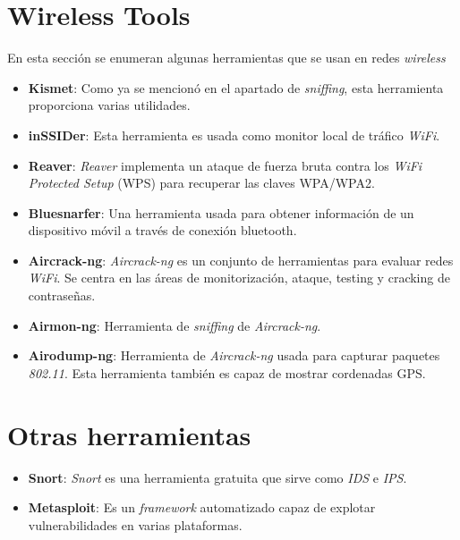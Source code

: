\documentclass[bibliography=totocnumbered]{scrartcl}
\begin{document}
\section{Wireless Tools}
En esta sección se enumeran algunas herramientas que se usan en redes \textit{wireless}
\begin{itemize}
    \item \textbf{Kismet}\parencite{kismet}: Como ya se mencionó en el apartado de \textit{sniffing}, esta herramienta proporciona varias utilidades.
    \item \textbf{inSSIDer}\parencite{inssider}: Esta herramienta es usada como monitor local de tráfico \textit{WiFi}.
    \item \textbf{Reaver}\parencite{reaver}: \textit{Reaver} implementa un ataque de fuerza bruta contra los \textit{WiFi Protected Setup} (WPS) para recuperar las claves WPA/WPA2.
    \item \textbf{Bluesnarfer}\parencite{bluesnarfer}: Una herramienta usada para obtener información de un dispositivo móvil a través de conexión bluetooth.
    \item \textbf{Aircrack-ng}\parencite{aircrack}: \textit{Aircrack-ng} es un conjunto de herramientas para evaluar redes \textit{WiFi}. Se centra en las áreas de monitorización, ataque, testing y cracking de contraseñas.
    \item \textbf{Airmon-ng}\parencite{airmon}: Herramienta de \textit{sniffing} de \textit{Aircrack-ng}\parencite{aircrack}.
    \item \textbf{Airodump-ng}\parencite{airodump}: Herramienta de \textit{Aircrack-ng}\parencite{aircrack} usada para capturar paquetes \textit{802.11}. Esta herramienta también es capaz de mostrar cordenadas GPS.
\end{itemize}

\newpage
\section{Otras herramientas}
\begin{itemize}
    \item \textbf{Snort}\parencite{snort}: \textit{Snort} es una herramienta gratuita que sirve como \textit{IDS}\parencite{ids} e \textit{IPS}\parencite{ips}.
    \item \textbf{Metasploit}\parencite{metasploit}: Es un \textit{framework} automatizado capaz de explotar vulnerabilidades en varias plataformas.
\end{itemize}

\newpage
\nocite{*}
\printbibliography 
\end{document}
